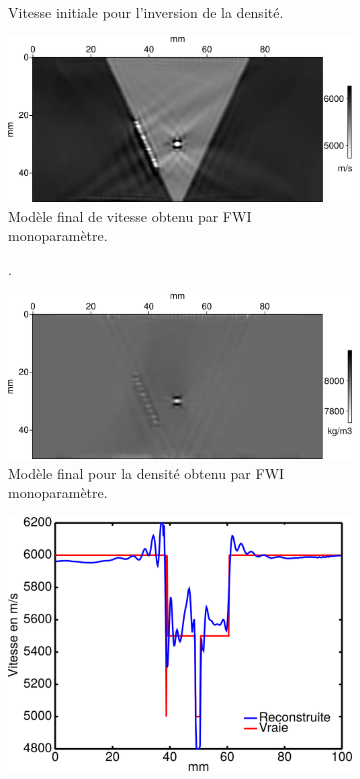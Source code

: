 \begin{figure}[!h]
\begin{changemargin}{-2cm}{-2cm}
\begin{subfigure}[b]{0.29\textwidth}
			\caption{Vitesse initiale pour l'inversion de la densité. }
		\end{subfigure}
		\begin{subfigure}[b]{0.29\textwidth}
			\includegraphics[width=\textwidth]{img/mono_param/vp_mono.png}
			\caption{Modèle final de vitesse obtenu par FWI monoparamètre.}
		\end{subfigure}
		\begin{subfigure}[b]{0.29\textwidth}
			\caption{.}
		\end{subfigure}
		\begin{subfigure}[b]{0.29\textwidth}
			\includegraphics[width=\textwidth]{img/mono_param/rho_mono.png}
			\caption{Modèle final pour la densité obtenu par FWI monoparamètre. }
		\end{subfigure}
		\begin{subfigure}[b]{0.29\textwidth}
			\includegraphics[width=\textwidth]{img/mono_param/coupe_vp_mono.png}

\end{subfigure}
\end{changemargin}
\end{figure}
